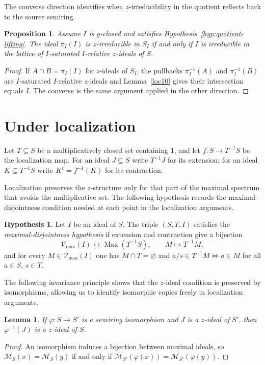 \documentclass[11pt,leqno]{amsart}
\theoremstyle{plain}
\newtheorem{proposition}[theorem]{Proposition}
\newtheorem{lemma}[theorem]{Lemma}
\theoremstyle{definition}
\newtheorem{hypothesis}[theorem]{Hypothesis}
\theoremstyle{remark}
\numberwithin{equation}{section}
\DeclareMathOperator{\Max}{Max}
\newcommand{\M}{\mathcal M}
\begin{document}
The converse direction identifies when $z$-irreducibility in the
quotient reflects back to the source semiring.

\begin{proposition}\label{prop:quotient-irred-reflect}
Assume $I$ is $g$-closed and satisfies
Hypothesis~\ref{hyp:quotient-lifting}.
The ideal $\pi_I(I)$ is $z$-irreducible in $S_I$ if and only if
$I$ is irreducible in the lattice of $I$-saturated $I$-relative
$z$-ideals of $S$.
\end{proposition}
\begin{proof}
If $A\cap B=\pi_I(I)$ for $z$-ideals of $S_I$, the pullbacks
$\pi_I^{-1}(A)$ and $\pi_I^{-1}(B)$ are $I$-saturated $I$-relative
$z$-ideals and Lemma~\ref{loc10} gives their intersection equals $I$.
The converse is the same argument applied in the other direction.
\end{proof}

\section{Under localization}\label{sec:local}

Let $T\subseteq S$ be a multiplicatively closed set containing $1$,
and let $f:S\to T^{-1}S$ be the localization map.
For an ideal $J\subseteq S$ write $T^{-1}J$ for its extension;
for an ideal $K\subseteq T^{-1}S$ write $K^c=f^{-1}(K)$
for its contraction.

Localization preserves the $z$-structure only for that part of the
maximal spectrum that avoids the multiplicative set.
The following hypothesis records the maximal-disjointness condition
needed at each point in the localization arguments.

\begin{hypothesis}\label{hyp:local}
Let $I$ be an ideal of $S$.
The triple $(S,T,I)$ satisfies the \emph{maximal-disjointness
hypothesis} if extension and contraction give a bijection
\[
\mathcal{V}_{\max}(I)\longleftrightarrow\Max(T^{-1}S),
\qquad M\longmapsto T^{-1}M,
\]
and for every $M\in\mathcal{V}_{\max}(I)$ one has $M\cap T=\varnothing$
and $a/s\in T^{-1}M\Leftrightarrow a\in M$ for all $a\in S$,
$s\in T$.
\end{hypothesis}

The following invariance principle shows that the $z$-ideal condition
is preserved by isomorphisms, allowing us to identify isomorphic
copies freely in localization arguments.

\begin{lemma}\label{loc13}
If $\varphi:S\to S'$ is a semiring isomorphism and $J$ is a
$z$-ideal of $S'$, then $\varphi^{-1}(J)$ is a $z$-ideal of $S$.
\end{lemma}
\begin{proof}
An isomorphism induces a bijection between maximal ideals,
so $\M_S(x)=\M_S(y)$ if and only if
$\M_{S'}(\varphi(x))=\M_{S'}(\varphi(y))$.
\end{proof}
\end{document}
